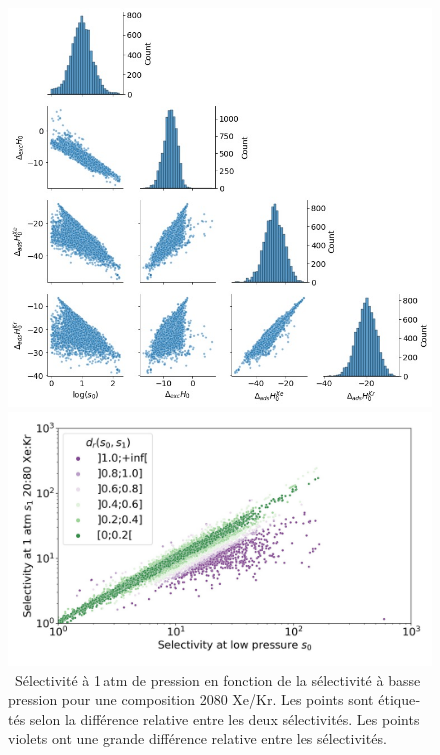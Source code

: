\documentclass[thesis]{subfiles}
\begin{document}
\begin{otherlanguage}{french}
\begin{figure}[h]
\begin{minipage}[t]{.43\textwidth}
\centering
  \includegraphics[width=\linewidth]{figures/2-thermo/Enthalpy_0_log.jpg}
  \caption{\small{\ Pour 8\,401 MOFs avec une sélectivité Xe/Kr favorable ($s\e{0} > 1$), pair-plots entre les différentes grandeurs $\log(s\e{0})$, $\Delta\e{exc}H\e{0}$, $\Delta\e{ads}H\ex{Xe}\e{0}$ et $\Delta\e{ads}H\ex{Kr}\e{0}$ (les enthalpies sont en \si{\kilo\joule\per\mol}) en dehors de la diagonale et la distribution de chaque grandeur sur la diagonale.}}\label{fgr:histo_H_resume}
\end{minipage}
\hfill
\begin{minipage}[t]{.5\textwidth}
\centering
  \includegraphics[width=\linewidth]{figures/2-thermo/s_0_vs_s_2080_overview_log.jpg}
  \caption{\small{\ Sélectivité à 1\,atm de pression en fonction de la sélectivité à basse pression pour une composition 20\pp{}80 Xe/Kr. Les points sont étiquetés selon la différence relative entre les deux sélectivités. Les points violets ont une grande différence relative entre les sélectivités. }}
  \label{fgr:overview_resume}
\end{minipage}
\end{figure}


\end{otherlanguage}
\end{document}
